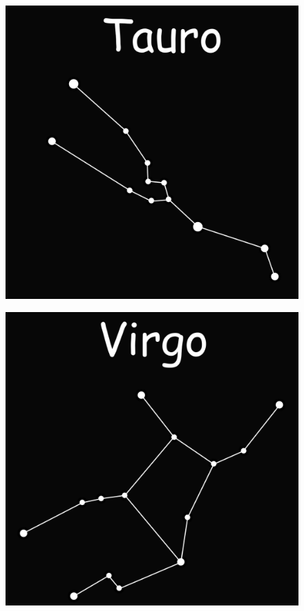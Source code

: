\documentclass{beamer}
\begin{document}
\begin{frame}
 \begin{figure}
   \centering
   \includegraphics[scale=0.2]{Imagenes/Tauro_01}
  \end{figure}
\end{frame}

\begin{frame}
 \begin{figure}
   \centering
   \includegraphics[scale=0.2]{Imagenes/Virgo_01}
  \end{figure}
\end{frame}
\end{document}
